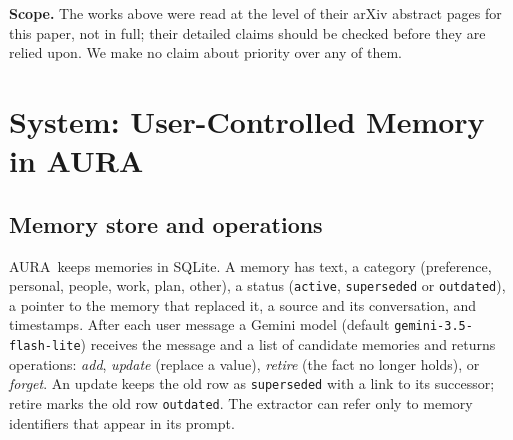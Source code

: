 \IfFileExists{IEEEtran.cls}{\documentclass[journal]{IEEEtran}\def\HAVEIEEE{1}}{\documentclass[10pt,twocolumn]{article}\usepackage[margin=0.7in,columnsep=0.25in]{geometry}}
\newcommand{\aura}{AURA}
\begin{document}
\begin{table}[t]
\centering\footnotesize
\caption{What the cited works study (from their abstracts).}
\label{tab:related}
\end{table}

\textbf{Scope.} The works above were read at the level of their arXiv abstract pages for this paper, not in full; their detailed claims should be checked before they are relied upon. We make no claim about priority over any of them.

\section{System: User-Controlled Memory in \aura}
\label{sec:system}
\subsection{Memory store and operations}
\aura\ keeps memories in SQLite. A memory has text, a category (preference, personal, people, work, plan, other), a status (\texttt{active}, \texttt{superseded} or \texttt{outdated}), a pointer to the memory that replaced it, a source and its conversation, and timestamps. After each user message a Gemini model (default \texttt{gemini-3.5-flash-lite}) receives the message and a list of candidate memories and returns operations: \emph{add}, \emph{update} (replace a value), \emph{retire} (the fact no longer holds), or \emph{forget}. An update keeps the old row as \texttt{superseded} with a link to its successor; retire marks the old row \texttt{outdated}. The extractor can refer only to memory identifiers that appear in its prompt.
\end{document}
